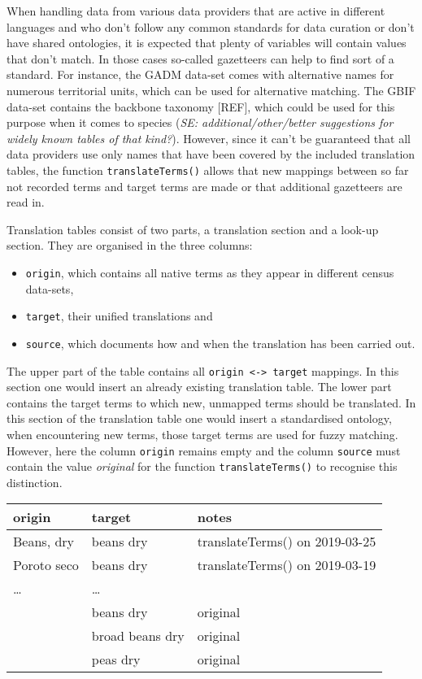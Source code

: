 \documentclass[12pt,]{article}
\providecommand{\tightlist}{%
  \setlength{\itemsep}{0pt}\setlength{\parskip}{0pt}}
\begin{document}
When handling data from various data providers that are active in different languages and who don't follow any common standards for data curation or don't have shared ontologies, it is expected that plenty of variables will contain values that don't match.
In those cases so-called gazetteers can help to find sort of a standard.
For instance, the GADM data-set comes with alternative names for numerous territorial units, which can be used for alternative matching. The GBIF data-set contains the backbone taxonomy {[}REF{]}, which could be used for this purpose when it comes to species (\emph{SE: additional/other/better suggestions for widely known tables of that kind?}).
However, since it can't be guaranteed that all data providers use only names that have been covered by the included translation tables, the function \texttt{translateTerms()} allows that new mappings between so far not recorded terms and target terms are made or that additional gazetteers are read in.

Translation tables consist of two parts, a translation section and a look-up section. They are organised in the three columns:

\begin{itemize}
\tightlist
\item
  \texttt{origin}, which contains all native terms as they appear in different census data-sets,
\item
  \texttt{target}, their unified translations and
\item
  \texttt{source}, which documents how and when the translation has been carried out.
\end{itemize}

The upper part of the table contains all \texttt{origin\ \textless{}-\textgreater{}\ target} mappings.
In this section one would insert an already existing translation table.
The lower part contains the target terms to which new, unmapped terms should be translated.
In this section of the translation table one would insert a standardised ontology, when encountering new terms, those target terms are used for fuzzy matching.
However, here the column \texttt{origin} remains empty and the column \texttt{source} must contain the value \emph{original} for the function \texttt{translateTerms()} to recognise this distinction.

\begin{longtable}[]{@{}lll@{}}
\toprule
origin & target & notes\tabularnewline
\midrule
\endhead
Beans, dry & beans dry & translateTerms() on 2019-03-25\tabularnewline
Poroto seco & beans dry & translateTerms() on 2019-03-19\tabularnewline
\ldots{} & \ldots{} &\tabularnewline
& beans dry & original\tabularnewline
& broad beans dry & original\tabularnewline
& peas dry & original\tabularnewline
\bottomrule
\end{longtable}
\end{document}

